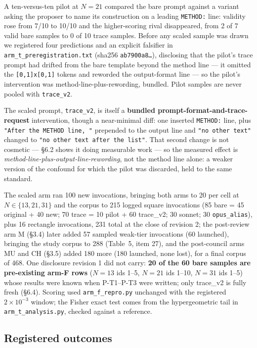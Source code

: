 \documentclass[11pt]{article}
\begin{document}
A ten-versus-ten pilot at $N = 21$ compared the bare prompt against a variant asking the proposer to
name its construction on a leading \texttt{METHOD:} line: validity rose from 7/10 to 10/10 and the
higher-scoring rival disappeared, from 2 of 7 valid bare samples to 0 of 10 trace samples. Before
any scaled sample was drawn we registered four predictions and an explicit falsifier in
\texttt{arm\_t\_preregistration.txt} (sha256 \texttt{ab7900a8\dots}), disclosing that the pilot's trace prompt had
drifted from the bare template beyond the method line --- it omitted the \texttt{[0,1]x[0,1]} tokens and
reworded the output-format line --- so the pilot's intervention was method-line-plus-rewording,
bundled. Pilot samples are never pooled with \texttt{trace\_v2}.

The scaled prompt, \texttt{trace\_v2}, is itself a \textbf{bundled prompt-format-and-trace-request}
intervention, though a near-minimal diff: one inserted \texttt{METHOD:} line, plus \texttt{"After the METHOD
line, "} prepended to the output line and \texttt{"no other text"} changed to \texttt{"no other text after the
list"}. That second change is not cosmetic --- \S6.2 shows it doing measurable work --- so the measured
effect is \textit{method-line-plus-output-line-rewording}, not the method line alone: a weaker version of
the confound for which the pilot was discarded, held to the same standard.

The scaled arm ran 100 new invocations, bringing both arms to 20 per cell at $N \in \{13, 21, 31\}$ and
the corpus to 215 logged square invocations (85 bare = 45 original + 40 new; 70 trace = 10 pilot +
60 trace\_v2; 30 sonnet; 30 \texttt{opus\_alias}), plus 16 rectangle invocations, 231 total at the
close of revision 2; the post-review arm M (\S3.4) later added 57 sampled weak-tier invocations
(60 launched), bringing the study corpus to 288 (Table~5, item
27), and the post-council arms MU and CH (\S3.5) added 180 more (180 launched, none lost),
for a final corpus of 468. One disclosure revision 1 did not carry: \textbf{20 of the 60 bare samples are pre-existing arm-F
rows} ($N = 13$ ids 1--5, $N = 21$ ids 1--10, $N = 31$ ids 1--5) whose results were known when P-T1--P-T3
were written; only trace\_v2 is fully fresh (\S6.4). Scoring used \texttt{arm\_f\_repro.py} unchanged with
the registered $2\times10^{-3}$ window; the Fisher exact test comes from the hypergeometric tail in
\texttt{arm\_t\_analysis.py}, checked against a reference.

\subsection{Registered outcomes}
\end{document}
